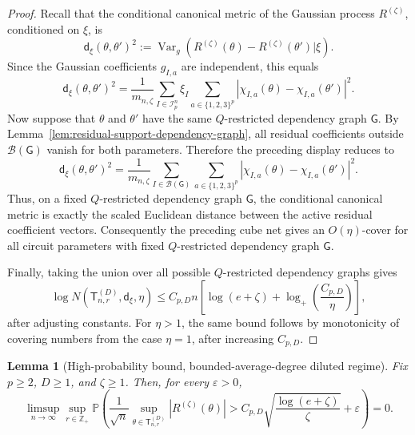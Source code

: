 \documentclass[12pt]{article}
\newtheorem{lemma}[theorem]{Lemma}
\newcommand{\mcB}{\mathcal{B}}
\newcommand{\mcI}{\mathcal{I}}
\begin{document}
\begin{proof}
Recall that the conditional canonical metric of the Gaussian process
\(R^{(\zeta)}\), conditioned on \(\xi\), is
\[
    \mathsf{d}_\xi(\theta,\theta')^2
    :=
    \operatorname{Var}_g
    \left(
        R^{(\zeta)}(\theta)
        -
        R^{(\zeta)}(\theta')
        \big| \xi
    \right).
\]
Since the Gaussian coefficients \(g_{I,a}\) are independent, this equals
\[
    \mathsf{d}_\xi(\theta,\theta')^2
    =
    \frac1{m_{n,\zeta}}
    \sum_{I\in\mcI_p^n}
    \xi_I
    \sum_{a\in\{1,2,3\}^p}
    |\chi_{I,a}(\theta)-\chi_{I,a}(\theta')|^2 .
\]
Now suppose that \(\theta\) and \(\theta'\) have the same \(Q\)-restricted dependency graph \(\mathsf G\). By Lemma~\ref{lem:residual-support-dependency-graph},
all residual coefficients outside \(\mcB(\mathsf G)\) vanish for both
parameters. Therefore the preceding display reduces to
\[
    \mathsf{d}_\xi(\theta,\theta')^2
    =
    \frac1{m_{n,\zeta}}
    \sum_{I\in\mcB(\mathsf G)}
    \sum_{a\in\{1,2,3\}^p}
    |\chi_{I,a}(\theta)-\chi_{I,a}(\theta')|^2 .
\]
Thus, on a fixed  \(Q\)-restricted dependency graph \(\mathsf G\), the conditional canonical metric is exactly the scaled Euclidean
distance between the active residual coefficient vectors. Consequently the
preceding cube net gives an \(O(\eta)\)-cover for all circuit parameters with
fixed \(Q\)-restricted dependency graph \(\mathsf G\).

Finally, taking the union over all possible  \(Q\)-restricted dependency graphs gives
\[
\log N(\mathsf{T}_{n,r}^{(D)},\mathsf{d}_\xi,\eta)
\le
C_{p,D} n
\left[
    \log(e+\zeta)
    +
    \log_+\left(\frac{C_{p,D}}{\eta}\right)
\right],
\]
after adjusting constants. For \(\eta>1\), the same bound follows by monotonicity of covering numbers
from the case \(\eta=1\), after increasing \(C_{p,D}\).
\end{proof}

\begin{lemma}[High-probability bound, bounded-average-degree diluted regime]
\label{lem:zeta-critical-residual-high-prob}
Fix \(p\ge2\), \(D\ge1\), and \(\zeta\ge1\). Then, for every
\(\varepsilon>0\),
\[
\limsup_{n\to\infty}
\sup_{r\in\mathbb Z_+}
\mathbb P\left(
\frac1{\sqrt n}
\sup_{\theta\in\mathsf{T}_{n,r}^{(D)}}
|R^{(\zeta)}(\theta)|
>
C_{p,D}\sqrt{\frac{\log(e+\zeta)}{\zeta}}
+\varepsilon
\right)
=0.
\]
\end{lemma}
\end{document}
